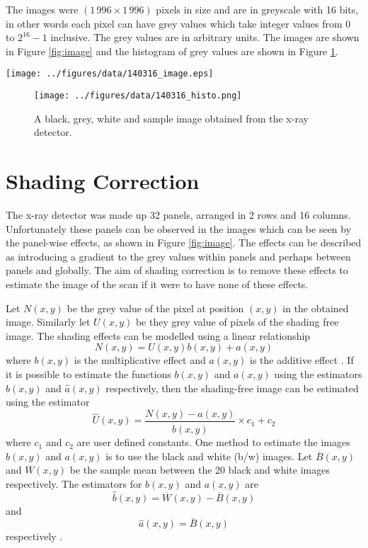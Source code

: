 \documentclass[a4paper]{proc}
\begin{document}
The images were $(1\,996\times1\,996)$ pixels in size and are in greyscale with 16 bits, in other words each pixel can have grey values which take integer values from 0 to $2^{16}-1$ inclusive. The grey values are in arbitrary units. The images are shown in Figure \ref{fig:image} and the histogram of grey values are shown in Figure \ref{fig:hist}.

\begin{figure*}
	\centering
	\texttt{[image: ../figures/data/140316\_image.eps]}
	\caption{A black, grey, white and sample image obtained from the x-ray detector.}
	\label{fig:image}
\end{figure*}

\begin{figure}
	\centering
	\texttt{[image: ../figures/data/140316\_histo.png]}
	\caption{A black, grey, white and sample image obtained from the x-ray detector.}
	\label{fig:hist}
\end{figure}

\section{Shading Correction}
The x-ray detector was made up 32 panels, arranged in 2 rows and 16 columns. Unfortunately these panels can be observed in the images which can be seen by the panel-wise effects, as shown in Figure \ref{fig:image}. The effects can be described as introducing a gradient to the grey values within panels and perhaps between panels and globally. The aim of shading correction is to remove these effects to estimate the image of the scan if it were to have none of these effects.

Let $N(x,y)$ be the grey value of the pixel at position $(x,y)$ in the obtained image. Similarly let $U(x,y)$ be they grey value of pixels of the shading free image. The shading effects can be modelled using a linear relationship
\begin{equation}
N(x,y) = U(x,y)b(x,y) + a(x,y)
\end{equation} 
where $b(x,y)$ is the multiplicative effect and $a(x,y)$ is the additive effect \cite{munzenmayer2003enhancing}. If it is possible to estimate the functions $b(x,y)$ and $a(x,y)$ using the estimators $\widehat{b}(x,y)$ and $\widehat{a}(x,y)$ respectively, then the shading-free image can be estimated using the estimator
\begin{equation}
\widehat{U}(x,y) = \frac{N(x,y)-\widehat{a}(x,y)}{\widehat{b}(x,y)} \times c_1 + c_2
\end{equation}
where $c_1$ and $c_2$ are user defined constants.
One method to estimate the images $b(x,y)$ and $a(x,y)$ is to use the black and white (b/w) images. Let $\overline{B}(x,y)$ and $\overline{W}(x,y)$ be the sample mean between the 20 black and white images respectively. The estimators for $b(x,y)$ and $a(x,y)$ are
\begin{equation}
\widehat{b}(x,y) = \overline{W}(x,y) - \overline{B}(x,y)
\end{equation}
and
\begin{equation}
\widehat{a}(x,y) = \overline{B}(x,y)
\end{equation}
respectively \cite{young2000shading}.
\end{document}
